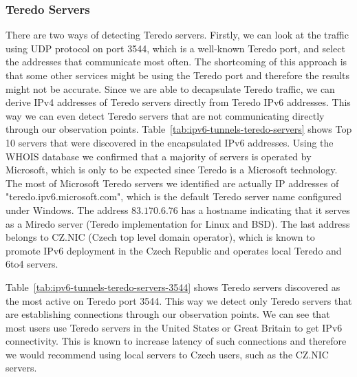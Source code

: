 \subsubsection{Teredo Servers}
There are two ways of detecting Teredo servers. Firstly, we can look at the traffic using UDP protocol on port 3544, which is a well-known Teredo port, and select the addresses that communicate most often. The shortcoming of this approach is that some other services might be using the Teredo port and therefore the results might not be accurate. Since we are able to decapsulate Teredo traffic, we can derive IPv4 addresses of Teredo servers directly from Teredo IPv6 addresses. This way we can even detect Teredo servers that are not communicating directly through our observation points. Table~\ref{tab:ipv6-tunnels-teredo-servers} shows Top 10 servers that were discovered in the encapsulated IPv6 addresses. Using the WHOIS database we confirmed that a majority of servers is operated by Microsoft, which is only to be expected since Teredo is a Microsoft technology. The most of Microsoft Teredo servers we identified are actually IP addresses of "teredo.ipv6.microsoft.com", which is the default Teredo server name configured under Windows. The address $83.170.6.76$ has a hostname indicating that it serves as a Miredo server (Teredo implementation for Linux and BSD). The last address belongs to CZ.NIC (Czech top level domain operator), which is known to promote IPv6 deployment in the Czech Republic and operates local Teredo and 6to4 servers.

Table~\ref{tab:ipv6-tunnels-teredo-servers-3544} shows Teredo servers discovered as the most active on Teredo port 3544. This way we detect only Teredo servers that are establishing connections through our observation points. We can see that most users use Teredo servers in the United States or Great Britain to get IPv6 connectivity. This is known to increase latency of such connections and therefore we would recommend using local servers to Czech users, such as the CZ.NIC servers.

